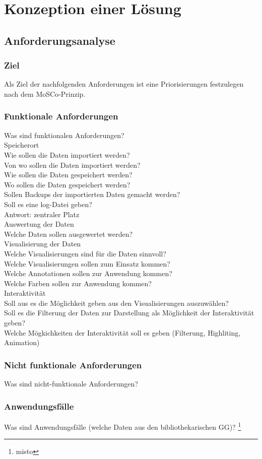 \chapter{Konzeption einer Lösung}

\section{Anforderungsanalyse}


\subsection{Ziel}
Als Ziel der nachfolgenden Anforderungen ist  eine Priorisierungen festzulegen nach dem MoSCo-Prinzip.
\subsection{Funktionale Anforderungen}
Was sind funktionalen Anforderungen?\\
Speicherort\\
Wie sollen die Daten importiert werden?\\
Von wo sollen die Daten importiert werden?\\
Wie sollen die Daten gespeichert werden?\\
Wo sollen die Daten gespeichert werden?\\
Sollen Backups der importierten Daten gemacht werden?\\
Soll es eine log-Datei geben?\\
Antwort: zentraler Platz\\

Auswertung der Daten\\
Welche Daten sollen ausgewertet werden?\\



Visualisierung der Daten\\
Welche Visualisierungen sind für die Daten sinnvoll?\\
Welche Visualisierungen sollen zum Einsatz kommen?\\
Welche Annotationen sollen zur Anwendung kommen?\\
Welche Farben sollen zur Anwendung kommen?\\



Interaktivität\\
Soll aus es die Möglichkeit geben aus den Visualisierungen auszuwählen?\\
Soll es die Filterung der Daten zur Darstellung als Möglichkeit der Interaktivität geben?\\
Welche Mögkichkeiten der Interaktivität soll es geben (Filterung, Highliting, Animation)\\
\subsection{Nicht funktionale Anforderungen}
Was sind nicht-funktionale Anforderungen?
\subsection{Anwendungsfälle}
Was sind Anwendungsfälle (welche Daten aus den bibliothekarischen GG)? 
\footnote{misto}